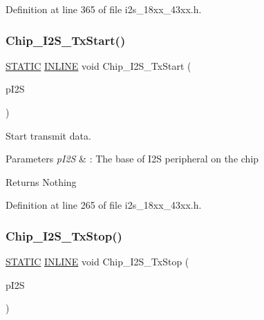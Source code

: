 Definition at line 365 of file i2s\+\_\+18xx\+\_\+43xx.\+h.

\mbox{\label{group___i2_s__18_x_x__43_x_x_ga84f5b666dcacef8140c1355ed308a782}} 
\subsubsection{\texorpdfstring{Chip\+\_\+\+I2\+S\+\_\+\+Tx\+Start()}{Chip\_I2S\_TxStart()}}
{\footnotesize\ttfamily \hyperlink{group___l_p_c___types___public___macros_ga10b2d890d871e1489bb02b7e70d9bdfb}{S\+T\+A\+T\+IC} \hyperlink{spifi__18xx__43xx_8h_a2eb6f9e0395b47b8d5e3eeae4fe0c116}{I\+N\+L\+I\+NE} void Chip\+\_\+\+I2\+S\+\_\+\+Tx\+Start (\begin{DoxyParamCaption}\item[{\hyperlink{struct_l_p_c___i2_s___t}{L\+P\+C\+\_\+\+I2\+S\+\_\+T} $\ast$}]{p\+I2S }\end{DoxyParamCaption})}



Start transmit data. 


\begin{DoxyParams}{Parameters}
{\em p\+I2S} & \+: The base of I2S peripheral on the chip \\
\hline
\end{DoxyParams}
\begin{DoxyReturn}{Returns}
Nothing 
\end{DoxyReturn}


Definition at line 265 of file i2s\+\_\+18xx\+\_\+43xx.\+h.

\mbox{\label{group___i2_s__18_x_x__43_x_x_gac7d296f84ba3283e63861515d134edfe}} 
\subsubsection{\texorpdfstring{Chip\+\_\+\+I2\+S\+\_\+\+Tx\+Stop()}{Chip\_I2S\_TxStop()}}
{\footnotesize\ttfamily \hyperlink{group___l_p_c___types___public___macros_ga10b2d890d871e1489bb02b7e70d9bdfb}{S\+T\+A\+T\+IC} \hyperlink{spifi__18xx__43xx_8h_a2eb6f9e0395b47b8d5e3eeae4fe0c116}{I\+N\+L\+I\+NE} void Chip\+\_\+\+I2\+S\+\_\+\+Tx\+Stop (\begin{DoxyParamCaption}\item[{\hyperlink{struct_l_p_c___i2_s___t}{L\+P\+C\+\_\+\+I2\+S\+\_\+T} $\ast$}]{p\+I2S }\end{DoxyParamCaption})}



